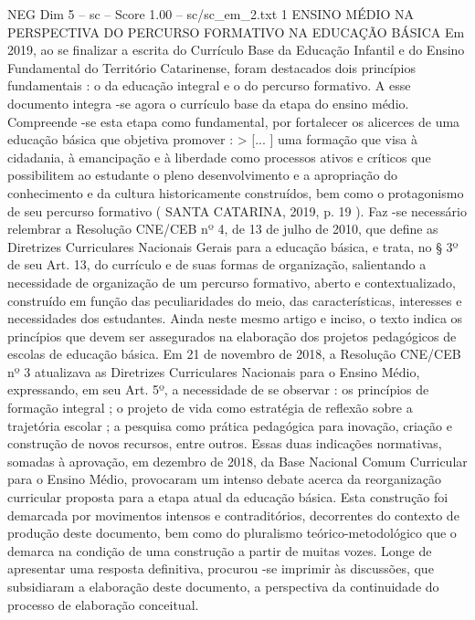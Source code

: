 \begin{textsample}{NEG Dim 5 – sc – Score 1.00 – sc/sc\_em\_2.txt}  \label{ex:f5_neg_258}
1 ENSINO MÉDIO NA PERSPECTIVA DO PERCURSO FORMATIVO NA EDUCAÇÃO BÁSICA Em 2019, ao se finalizar a escrita do Currículo Base da Educação Infantil e do Ensino Fundamental do Território Catarinense, foram destacados dois princípios fundamentais : o da educação integral e o do percurso formativo.
A esse documento integra -se agora o currículo base da etapa do ensino médio.
Compreende -se esta etapa como fundamental, por fortalecer os alicerces de uma educação básica que objetiva promover : > [... ] uma formação que visa à cidadania, à emancipação e à liberdade como processos ativos e críticos que possibilitem ao estudante o pleno desenvolvimento e a apropriação do conhecimento e da cultura historicamente construídos, bem como o protagonismo de seu percurso formativo ( SANTA CATARINA, 2019, p. 19 ).
Faz -se necessário relembrar a Resolução CNE/CEB nº 4, de 13 de julho de 2010, que define as Diretrizes Curriculares Nacionais Gerais para a educação básica, e trata, no § 3º de seu Art. 13, do currículo e de suas formas de organização, salientando a necessidade de organização de um percurso formativo, aberto e contextualizado, construído em função das peculiaridades do meio, das características, interesses e necessidades dos estudantes.
Ainda neste mesmo artigo e inciso, o texto indica os princípios que devem ser assegurados na elaboração dos projetos pedagógicos de escolas de educação básica.
Em 21 de novembro de 2018, a Resolução CNE/CEB nº 3 atualizava as Diretrizes Curriculares Nacionais para o Ensino Médio, expressando, em seu Art. 5º, a necessidade de se observar : os princípios de formação integral ; o projeto de vida como estratégia de reflexão sobre a trajetória escolar ; a pesquisa como prática pedagógica para inovação, criação e construção de novos recursos, entre outros.
Essas duas indicações normativas, somadas à aprovação, em dezembro de 2018, da Base Nacional Comum Curricular para o Ensino Médio, provocaram um intenso debate acerca da reorganização curricular proposta para a etapa atual da educação básica.
Esta construção foi demarcada por movimentos intensos e contraditórios, decorrentes do contexto de produção deste documento, bem como do pluralismo teórico-metodológico que o demarca na condição de uma construção a partir de muitas vozes.
Longe de apresentar uma resposta definitiva, procurou -se imprimir às discussões, que subsidiaram a elaboração deste documento, a perspectiva da continuidade do processo de elaboração conceitual.

\end{textsample}
